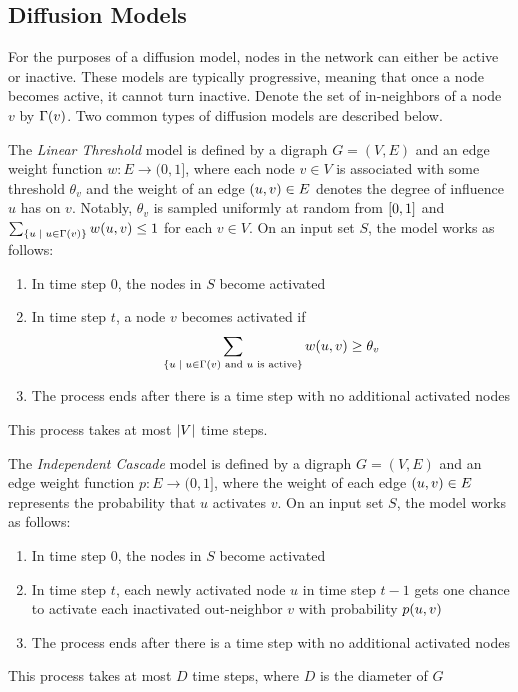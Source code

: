 \subsection{Diffusion Models}
For the purposes of a diffusion model, nodes in the network can either be active or inactive. These models are typically progressive, meaning that once a node becomes active, it cannot turn inactive. Denote the set of in-neighbors of a node $v$ by $\Gamma \! \left( v \right)$. Two common types of diffusion models are described below. 

\begin{definition}[LT Model]
    \label{def:linear_threshold}
    The \emph{Linear Threshold} model is defined by a digraph $G = (V, E)$ and an edge weight function $w: E \rightarrow (0, 1]$, where each node $v \in V$ is associated with some threshold $\theta_v$ and the weight of an edge $\left( u, v \right) \in E$ denotes the degree of influence $u$ has on $v$.
    Notably, $\theta_v$ is sampled uniformly at random from $\left[ 0, 1 \right]$ and $\sum_{\left\{ u \;\mid\; u \in \Gamma \left( v \right) \right\}} w \! \left( u,v \right) \leq 1$ for each $v \in V$. On an input set $S$, the model works as follows:
    \begin{enumerate}
        \item In time step $0$, the nodes in $S$ become activated
        \item In time step $t$, a node $v$ becomes activated if 
            \begin{equation*}
                \sum_{\left\{ u \;\mid\; u \in \Gamma(v) \text{ and } u \text{ is active} \right\}} w \! \left( u,v \right) \geq \theta_v
            \end{equation*}
        \item The process ends after there is a time step with no additional activated nodes
    \end{enumerate}
    This process takes at most $\left\lvert V \right\rvert$ time steps. 
\end{definition}

\begin{definition}[IC Model]
    \label{def:independent_cascade}
    The \emph{Independent Cascade} model is defined by a digraph $G = (V, E)$ and an edge weight function $p: E \rightarrow (0, 1]$, where the weight of each edge $\left( u,v \right) \in E$ represents the probability that $u$ activates $v$. 
    On an input set $S$, the model works as follows:
    \begin{enumerate}
        \item In time step $0$, the nodes in $S$ become activated
        \item In time step $t$, each newly activated node $u$ in time step $t-1$ gets one chance to activate each inactivated out-neighbor $v$ with probability $p \! \left( u,v \right)$
        \item The process ends after there is a time step with no additional activated nodes
    \end{enumerate}
    This process takes at most $D$ time steps, where $D$ is the diameter of $G$
\end{definition}